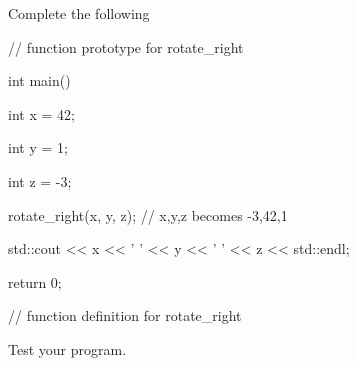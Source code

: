 Complete the following



\begin{consolethree}[escapeinside=||]

// function prototype for rotate_right



int main()

{

    int x = 42;

    int y = 1;

    int z = -3;

    rotate_right(x, y, z); // x,y,z becomes -3,42,1

    std::cout << x << ' ' << y << ' ' << z << std::endl;

    return 0;

}



// function definition for rotate_right

\end{consolethree}



Test your program.

